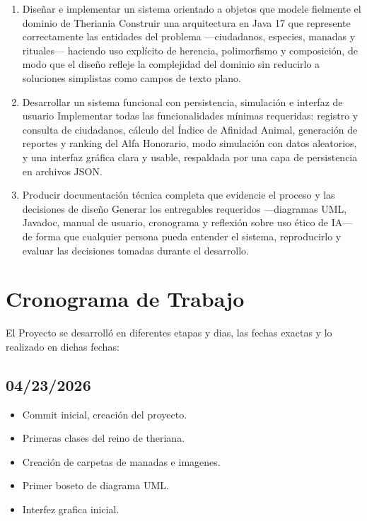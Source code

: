 \documentclass[man]{apa7}
\begin{document}
		\begin{enumerate}
			\item  Diseñar e implementar un sistema orientado a objetos que modele fielmente el dominio de Theriania Construir una arquitectura en Java 17 que represente correctamente las entidades del problema —ciudadanos, especies, manadas y rituales— haciendo uso explícito de herencia, polimorfismo y composición, de modo que el diseño refleje la complejidad del dominio sin reducirlo a soluciones simplistas como campos de texto plano.
			\item  Desarrollar un sistema funcional con persistencia, simulación e interfaz de usuario Implementar todas las funcionalidades mínimas requeridas: registro y consulta de ciudadanos, cálculo del Índice de Afinidad Animal, generación de reportes y ranking del Alfa Honorario, modo simulación con datos aleatorios, y una interfaz gráfica clara y usable, respaldada por una capa de persistencia en archivos JSON.
			\item  Producir documentación técnica completa que evidencie el proceso y las decisiones de diseño Generar los entregables requeridos —diagramas UML, Javadoc, manual de usuario, cronograma y reflexión sobre uso ético de IA— de forma que cualquier persona pueda entender el sistema, reproducirlo y evaluar las decisiones tomadas durante el desarrollo.
		\end{enumerate}
	
	\vspace*{\fill}
	
	\newpage
	
	\section*{Cronograma de Trabajo}\label{sec:Cronograma de Trabajo}
	
	El Proyecto se desarrolló en diferentes etapas y dias, las fechas exactas y lo realizado en dichas fechas:
	
	\subsection{04/23/2026}
		\begin{itemize}
			\item Commit inicial, creación del proyecto.
			\item Primeras clases del reino de theriana.
			\item Creación de carpetas de manadas e imagenes.
			\item Primer boseto de diagrama UML.
			\item Interfez grafica inicial.
		\end{itemize}
\end{document}
